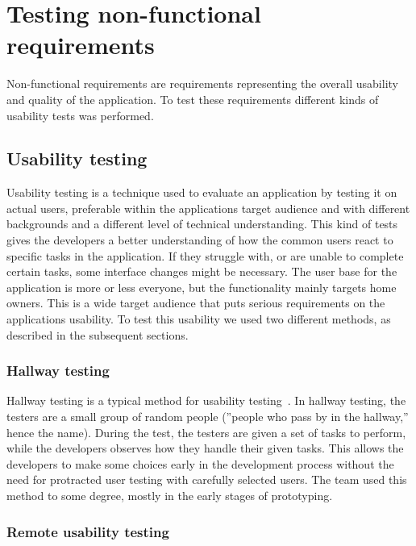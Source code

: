 \section{Testing non-functional requirements}
\label{sec:testingnonfunctionalrequirements}
Non-functional requirements are requirements representing the overall usability and quality of the application. To test these requirements different kinds of usability tests was performed.

\subsection{Usability testing}
\label{sec:userTest}

Usability testing is a technique used to evaluate an application by testing it on actual users, preferable within the applications target audience and with different backgrounds and a different level of technical understanding. This kind of tests gives the developers a better understanding of how the common users react to specific tasks in the application. If they struggle with, or are unable to complete certain tasks, some interface changes might be necessary.
The user base for the application is more or less everyone, but the functionality mainly targets home owners. This is a wide target audience that puts serious requirements on the applications usability. To test this usability we used two different methods, as described in the subsequent sections.

\subsubsection{Hallway testing}
Hallway testing is a typical method for usability testing~\cite{hallwaytesting}. In hallway testing, the testers are a small group of random people (''people who pass by in the hallway,'' hence the name). During the test, the testers are given a set of tasks to perform, while the developers observes how they handle their given tasks. This allows the developers to make some choices early in the development process without the need for protracted user testing with carefully selected users. 
The team used this method to some degree, mostly in the early stages of prototyping.


\subsubsection{Remote usability testing}

